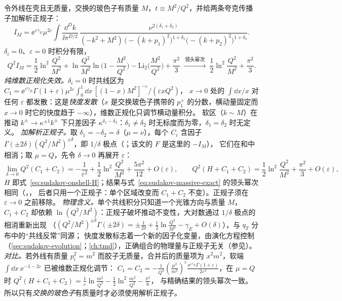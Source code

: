 \begin{example}\label{ex:sudakov-massive}
令外线在壳且无质量，交换的玻色子有质量 $M$，$t\equiv M^2/Q^2$，并给两条夸克传播子加解析正规子：
\[
I_M=\ee^{\varepsilon\gamma_E}\mu^{2\varepsilon}\!\int\!\frac{\dd^Dk}{\ii\pi^{D/2}}\,\frac{\nu^{2(\delta_1+\delta_2)}}{(-k^2+M^2)\,\big(-(k+p_1)^2\big)^{1+\delta_1}\big(-(k+p_2)^2\big)^{1+\delta_2}} .
\]
$\delta_i=0$、$\varepsilon=0$ 时积分有限，\cite[式~(6.30)]{Jantzen2011}
\begin{equation}\label{eq:sudakov-massive-exact}
Q^2I_M=\frac12\ln^2\frac{Q^2}{M^2}+\ln\frac{Q^2}{M^2}\ln\Big(1-\frac{M^2}{Q^2}\Big)-\mathrm{Li}_2\Big(\frac{M^2}{Q^2}\Big)+\frac{\pi^2}3
\ \xrightarrow{\ \text{领头幂次}\ }\ \frac12\ln^2\frac{Q^2}{M^2}+\frac{\pi^2}3 .
\end{equation}
\emph{纯维数正规化失效。}$\delta_i=0$ 时共线区为 $C_1=\ee^{\varepsilon\gamma_E}\Gamma(1+\varepsilon)\mu^{2\varepsilon}\int_0^1\dd x\,[(1-x)M^2]^{-\varepsilon}/(\varepsilon xQ^2)$，
$x\to0$ 处的 $\int\dd x/x$ 对任何 $\varepsilon$ 都发散：这是\emph{快度发散}（$x$ 是交换玻色子携带的 $p_1^+$ 的分数，横动量固定而 $x\to0$ 时它的快度趋于 $-\infty$），维数正规化只调节横动量积分。
软区（$k\sim M$）在推动 $k^\pm\to\kappa^{\pm1}k^\pm$ 下只差因子 $\kappa^{\delta_1-\delta_2}$：$\delta_1\ne\delta_2$ 时无标度而为零，$\delta_1=\delta_2$ 时无定义。
\emph{加解析正规子。}取 $\delta_1=-\delta_2=\delta$（$\mu=\nu$），每个 $C_i$ 含因子 $\Gamma(\pm2\delta)(Q^2/M^2)^{\pm\delta}$，即 $1/\delta$ 极点（\cite[式~(6.27)]{Jantzen2011}；该文的 $F$ 是这里的 $-I_M$），
它们在和中相消；取 $\mu=Q$，先令 $\delta\to0$ 再展开 $\varepsilon$：
\begin{equation}\label{eq:sudakov-massive-regions}
\lim_{\delta\to0}Q^2(C_1+C_2)=-\frac1{\varepsilon^2}+\frac12\ln^2\frac{Q^2}{M^2}+\frac{5\pi^2}{12}+O(\varepsilon),\qquad
Q^2(H+C_1+C_2)=\frac12\ln^2\frac{Q^2}{M^2}+\frac{\pi^2}3+O(\varepsilon),
\end{equation}
$H$ 即式~\eqref{eq:sudakov-onshell-H}；结果与式~\eqref{eq:sudakov-massive-exact} 的领头幂次相同（\cite[式~(6.29)--(6.30)]{Jantzen2011}，\cite[第~2.3~节，式~(2.50)--(2.52)]{BecherBroggioFerroglia2015}，
后者只用一个正规子：单个区域改变而 $C_1+C_2$ 不变）。正规子须在 $\varepsilon\to0$ 之前移除。
\emph{物理含义。}单个共线积分只知道一个光锥方向与质量 $M$，$C_1+C_2$ 却依赖 $\ln(Q^2/M^2)$：正规子破坏推动不变性，大对数通过 $1/\delta$ 极点的相消重新出现
（$(Q^2/M^2)^{\pm\delta}\Gamma(\pm2\delta)=\pm\frac1{2\delta}+\frac12\ln\frac{Q^2}{M^2}-\gamma_E+O(\delta)$），与 $q_T$ 分布中的“共线反常”\cite{BecherNeubert2011}同源；
快度发散标志着一个新的因子化变量，由演化方程控制（\cref{sec:sudakov-evolution}；\cref{ch:tmd}），正确组合的物理量与正规子无关（参见\cite{BecherBell2012}）。
\emph{对比。}若外线有质量 $p_i^2=m^2$ 而胶子无质量，合并后的质量项为 $x^2m^2$，软端 $\int\dd x\,x^{-1-2\varepsilon}$ 已被维数正规化调节：
$C_1=C_2=-\frac1{Q^2}(\frac{\mu^2}{m^2})^\varepsilon\frac{\ee^{\varepsilon\gamma_E}\Gamma(1+\varepsilon)}{2\varepsilon^2}$，在 $\mu=Q$ 时 $Q^2(H+C_1+C_2)=\frac1\varepsilon\ln\frac{m^2}{Q^2}-\frac12\ln^2\frac{m^2}{Q^2}-\frac{\pi^2}6$，
与精确结果的领头幂次一致。%
所以只有\emph{交换的玻色子}有质量时才必须使用解析正规子。
\end{example}

